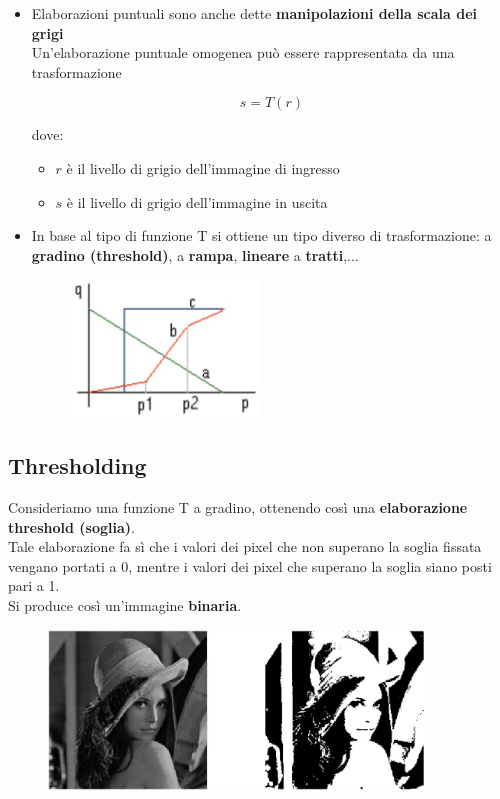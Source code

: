 \begin{itemize}
    \item Elaborazioni puntuali sono anche dette \textbf{manipolazioni della scala dei
              grigi}\\
          Un'elaborazione puntuale omogenea può essere rappresentata da
          una trasformazione

          $$
              s = T(r)
          $$

          dove:
          \begin{itemize}
              \item $r$ è il livello di grigio dell'immagine di ingresso
              \item $s$ è il livello di grigio dell'immagine in uscita
          \end{itemize}
    \item In base al tipo di funzione T si ottiene un tipo diverso di
          trasformazione: a \textbf{gradino (threshold)}, a \textbf{rampa},
          \textbf{lineare} a \textbf{tratti},...

          \begin{figure}[H]
              \centering
              \includegraphics[width=5cm, keepaspectratio]{capitoli/immagini/imgs/elaborazioni_puntuali_immagine.jpg}
          \end{figure}

\end{itemize}

\subsection{Thresholding}

Consideriamo una funzione T a gradino, ottenendo così una
\textbf{elaborazione threshold (soglia)}.\\
Tale elaborazione fa sì che i valori dei pixel che non superano la
soglia fissata vengano portati a 0, mentre i valori dei pixel che
superano la soglia siano posti pari a 1.\\
Si produce così un'immagine \textbf{binaria}.

\begin{figure}[H]
    \centering
    \includegraphics[width=10cm, keepaspectratio]{capitoli/immagini/imgs/foto_esempio_1.jpg}
\end{figure}

